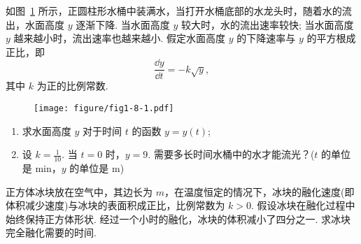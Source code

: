 	\begin{ti}
		如图~\ref{fig:1.8.1} 所示，正圆柱形水桶中装满水，当打开水桶底部的水龙头时，随着水的流出，水面高度 $y$ 逐渐下降. 当水面高度 $y$ 较大时，水的流出速率较快; 当水面高度 $y$ 越来越小时，流出速率也越来越小. 假定水面高度 $y$ 的下降速率与 $y$ 的平方根成正比，即
		\begin{equation}\label{eq:8.45}
			\frac{\dd{y}}{\dd{t}} = - k \sqrt{y},
		\end{equation}
		其中 $k$ 为正的比例常数.
		\begin{figure}[htbp]
			\centering
			\texttt{[image: figure/fig1-8-1.pdf]}
			\caption{}\label{fig:1.8.1}
		\end{figure}
		\begin{enumerate}
			\item 求水面高度 $y$ 对于时间 $t$ 的函数 $y = y(t)$;
			\item 设 $k = \frac{1}{10}$. 当 $t = 0$ 时，$y = 9$. 需要多长时间水桶中的水才能流光？($t$ 的单位是 \si{min}，$y$ 的单位是 \si{m})
		\end{enumerate}
	\end{ti}

	\begin{ti}
		正方体冰块放在空气中，其边长为 $m$，在温度恒定的情况下，冰块的融化速度(即体积减少速度)与冰块的表面积成正比，比例常数为 $k > 0$. 假设冰块在融化过程中始终保持正方体形状. 经过一个小时的融化，冰块的体积减小了四分之一. 求冰块完全融化需要的时间.
	\end{ti}